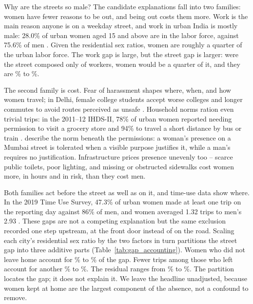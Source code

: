 \documentclass[12pt]{article}
\begin{document}

Why are the streets so male? The candidate explanations fall into two families: women have fewer reasons to be out, and being out costs them more. Work is the main reason anyone is on a weekday street, and work in urban India is mostly male: 28.0\% of urban women aged 15 and above are in the labor force, against 75.6\% of men \citep{plfs2024}. Given the residential sex ratios, women are roughly a quarter of the urban labor force. The work gap is large, but the street gap is larger: were the street composed only of workers, women would be a quarter of it, and they are \MinAllModeShare\% to \MaxAllModeShare\%.


The second family is cost. Fear of harassment shapes where, when, and how women travel; in Delhi, female college students accept worse colleges and longer commutes to avoid routes perceived as unsafe \citep{borker2021}. Household norms ration even trivial trips: in the 2011--12 IHDS-II, 78\% of urban women reported needing permission to visit a grocery store and 94\% to travel a short distance by bus or train \citep{ihds2012}. \citet{phadke2011} describe the norm beneath the permissions: a woman's presence on a Mumbai street is tolerated when a visible purpose justifies it, while a man's requires no justification. Infrastructure prices presence unevenly too -- scarce public toilets, poor lighting, and missing or obstructed sidewalks cost women more, in hours and in risk, than they cost men.

Both families act before the street as well as on it, and time-use data show where. In the 2019 Time Use Survey, 47.3\% of urban women made at least one trip on the reporting day against 86\% of men, and women averaged 1.32 trips to men's 2.93 \citep{goel2023gendergap}. These gaps are not a competing explanation but the same exclusion recorded one step upstream, at the front door instead of on the road. Scaling each city's residential sex ratio by the two factors in turn partitions the street gap into three additive parts (Table~\ref{tab:gap_accounting}). Women who did not leave home account for \MinGapNotOut\% to \MaxGapNotOut\% of the gap. Fewer trips among those who left account for another \MinGapFewerTrips\% to \MaxGapFewerTrips\%. The residual ranges from \MinGapResidual\% to \MaxGapResidual\%. The partition locates the gap; it does not explain it. We leave the headline unadjusted, because women kept at home are the largest component of the absence, not a confound to remove.
\end{document}
